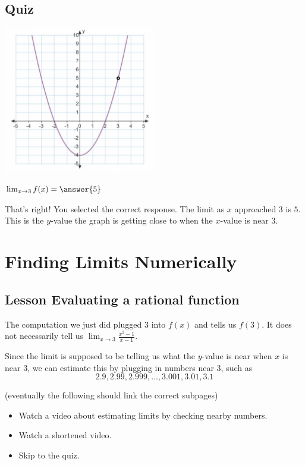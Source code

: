 \documentclass{ximera}
\begin{document}
\subsection{Quiz}
\begin{image}
\includegraphics[width=0.5\textwidth]{graph1.png}
\end{image}
\begin{question}  
$\lim_{x \to 3} f(x) = \answer{5}$  

\begin{explanation}
    That's right! You selected the correct response. The limit as $x$ approached $3$ is $5$. This is the $y$-value the graph is getting close to when the $x$-value is near $3$.
\end{explanation}
\end{question}


\section{Finding Limits Numerically}
\subsection{Lesson Evaluating a rational function}
\begin{center}
\end{center}

The computation we just did plugged 3 into $f(x)$ and tells us $f(3)$. It does not necessarily tell us $\lim_{x \to 3} \frac{x^2-1}{x-1}$.

Since the limit is supposed to be telling us what the $y$-value is near when $x$ is near $3$, we can estimate this by plugging in numbers near $3$, such as
\[
    2.9, 2.99, 2.999, \ldots, 3.001, 3.01, 3.1
\]

(eventually the following should link the correct subpages)
\begin{itemize}
    \item {} Watch a video about estimating limits by checking nearby numbers.
    \item {} Watch a shortened video.
    \item {} Skip to the quiz.
\end{itemize}
\end{document}
